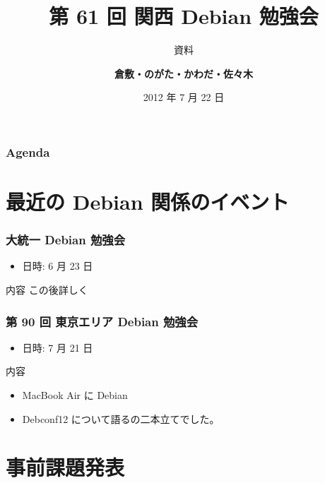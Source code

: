 \documentclass[cjk,dvipdfmx,10pt,%
hyperref={bookmarks=true,bookmarksnumbered=true,bookmarksopen=false,%
colorlinks=false,%
pdftitle={第 61 回 関西 Debian 勉強会},%
pdfauthor={倉敷・のがた・かわだ・佐々木},%
pdfsubject={資料},%
}]{beamer}
\title{第 61 回 関西 Debian 勉強会}
\subtitle{{\scriptsize 資料}}
\author[かわだ てつたろう]{{\large\bf 倉敷・のがた・かわだ・佐々木}}
\institute[Debian JP]{{\normalsize\tt 関西 Debian 勉強会}}
\date{{\small 2012 年 7 月 22 日}}
\begin{document}
\settitleslide
\begin{frame}
\titlepage
\end{frame}
\setdefaultslide

\begin{frame}[fragile]
\frametitle{Agenda}

\tableofcontents

\end{frame}

\section{最近の Debian 関係のイベント}


\begin{frame}[fragile]
\frametitle{大統一 Debian 勉強会}

\begin{itemize}
\item 日時: 6 月 23 日
\end{itemize}

\begin{block}{内容}
  この後詳しく
\end{block}
\end{frame}

\begin{frame}[fragile]
  \frametitle{第 90 回 東京エリア Debian 勉強会}
  \begin{itemize}
  \item  日時: 7 月 21 日
  \end{itemize}
  \begin{block}{内容}
    \begin{itemize}
    \item MacBook Air に Debian
    \item Debconf12 について語るの二本立てでした。
    \end{itemize}
  \end{block}
\end{frame}


\section{事前課題発表}

\end{document}
